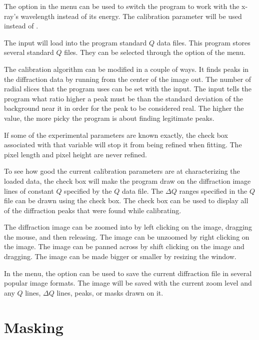 The  option in the  menu can
be used to switch the program to work with the x-ray's
wavelength instead of its energy. The calibration parameter 
\gui{$\lambda$:} will be used instead of .

The  input will load into the program standard $Q$ data files. 
This program stores several standard $Q$ files. They can be selected
through the  option of the  menu.

The calibration algorithm can be modified in a couple of ways.
It finds peaks in the diffraction data by 
running from the center of the image out. 
The number of radial slices that the program uses
can be set with the  input.
The  input 
tells the program what ratio higher a peak must be than the 
standard deviation of the background near it in order for the
peak to be considered real. The higher the value, the more
picky the program is about finding legitimate peaks.

If some of the experimental parameters are known exactly, 
the  check box associated with that variable 
will stop it from being refined when fitting. The pixel 
length and pixel height are never refined. 

To see how good the current calibration parameters are at
characterizing the loaded data, the  
check box will make the program draw 
on the diffraction image lines of constant $Q$ specified
by the $Q$ data file. The $\Delta Q$ ranges specified in 
the $Q$ file can be drawn using the  
check box. The  check box can be used to 
display all of the diffraction peaks that were found while 
calibrating.

The diffraction image can be zoomed into by left clicking
on the image, dragging the mouse, and then releasing.
The image can be unzoomed by right clicking on the image. 
The image can be panned across by shift clicking on the image 
and dragging. The image can be made bigger or smaller by 
resizing the window.

In the  menu, the  option can be used 
to save the current diffraction file in several popular
image formats. The image will be saved with the current
zoom level and any $Q$ lines, $\Delta Q$ lines, peaks, or
masks drawn on it.

\section{Masking}

